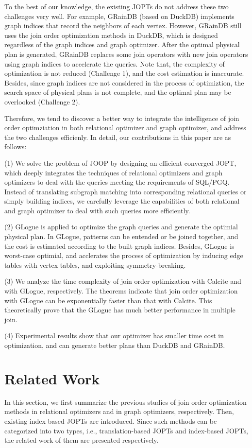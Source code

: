 \documentclass[sigconf, nonacm]{acmart}
\begin{document}
To the best of our knowledge, the existing JOPTs do not address these two challenges very well.
For example, GRainDB (based on DuckDB) implements graph indices that record the neighbors of each vertex.
However, GRainDB still uses the join order optimization methods in DuckDB, which is designed regardless of the graph indices and graph optimizer.
After the optimal physical plan is generated, GRainDB replaces some join operators with new join operators using graph indices to accelerate the queries.
Note that, the complexity of optimization is not reduced (Challenge 1), and the cost estimation is inaccurate.
Besides, since graph indices are not considered in the process of optimiztion, the search space of physical plans is not complete, and the optimal plan may be overlooked (Challenge 2).

Therefore, we tend to discover a better way to integrate the intelligence of join order optimziation in both relational optimizer and graph optimizer, and address the two challenges efficienly.
In detail, our contributions in this paper are as follows:

(1) We solve the problem of JOOP by designing an efficient converged JOPT, which deeply integrates the techniques of relational optimizers and graph optimizers to deal with the queries meeting the requirements of SQL/PGQ.
Instead of translating subgraph matching into corresponding relational queries or simply building indices, we carefully leverage the capabilities of both relational and graph optimizer to deal with such queries more efficiently.

(2) GLogue is applied to optimize the graph queries and generate the optimial physical plan.
In GLogue, patterns can be entended or be joined together, and the cost is estimated according to the built graph indices.
Besides, GLogue is worst-case optimial, and acclerates the process of optimization by inducing edge tables with vertex tables, and exploiting symmetry-breaking.

(3) We analyze the time complexity of join order optimization with Calcite and with GLogue, respectively.
The theorems indicate that join order optimization with GLogue can be exponentially faster than that with Calcite.
This theoretically prove that the GLogue has much better performance in multiple join.

(4) Experimental results show that our optimizer has smaller time cost in optimization, and can generate better plans than DuckDB and GRainDB.


\section{Related Work}
\label{sec:related-work}
In this section, we first summarize the previous studies of join order optimization methods in relational optimizers and in graph optimizers, respectively.
Then, existing index-based JOPTs are introduced.
Since such methods can be categorized into two types, i.e., translation-based JOPTs and index-based JOPTs, the related work of them are presented respectively.
\end{document}
